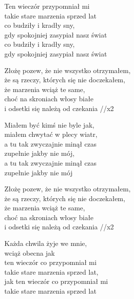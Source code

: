 \begin{text}
    
    Ten wieczór przypomniał mi\\
    takie stare marzenia sprzed lat\\
    co budziły i kradły sny,\\
    gdy spokojniej zasypiał nasz świat\\
    co budziły i kradły sny,\\
    gdy spokojniej zasypiał nasz świat

    \vin Złożę pozew, że nie wszystko otrzymałem,\\
    \vin że są rzeczy, których się nie doczekałem,\\
    \vin że marzenia wciąż te same,\\
    \vin choć na skroniach włosy białe\\ 
    \vin i odsetki się należą od czekania //x2

    Miałem być kimś nie byle jak,\\
    miałem chwytać w plecy wiatr,\\
    a tu tak zwyczajnie minął czas\\
    zupełnie jakby nie mój,\\
    a tu tak zwyczajnie minął czas\\
    zupełnie jakby nie mój

    \vin Złożę pozew, że nie wszystko otrzymałem, \\
    \vin że są rzeczy, których się nie doczekałem,\\
    \vin że marzenia wciąż te same,\\
    \vin choć na skroniach włosy białe \\ 
    \vin i odsetki się należą od czekania  //x2

    Każda chwila żyje we mnie,\\
    wciąż obecna jak\\
    ten wieczór co przypomniał mi \\
    takie stare marzenia sprzed lat,\\
    jak ten wieczór co przypomniał mi \\
    takie stare marzenia sprzed lat

	
\end{text}
